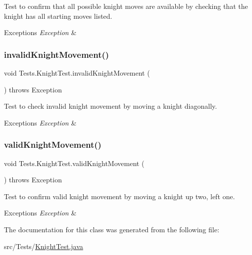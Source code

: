 Test to confirm that all possible knight moves are available by checking that the knight has all starting moves listed. 
\begin{DoxyExceptions}{Exceptions}
{\em Exception} & \\
\hline
\end{DoxyExceptions}
\hypertarget{class_tests_1_1_knight_test_a2055e2c815f2c80d89a9f9519702b712}{}\label{class_tests_1_1_knight_test_a2055e2c815f2c80d89a9f9519702b712} 
\subsubsection{\texorpdfstring{invalid\+Knight\+Movement()}{invalidKnightMovement()}}
{\footnotesize\ttfamily void Tests.\+Knight\+Test.\+invalid\+Knight\+Movement (\begin{DoxyParamCaption}{ }\end{DoxyParamCaption}) throws Exception}

Test to check invalid knight movement by moving a knight diagonally. 
\begin{DoxyExceptions}{Exceptions}
{\em Exception} & \\
\hline
\end{DoxyExceptions}
\hypertarget{class_tests_1_1_knight_test_aeef4aecba7d22407c8945dabf02ae3fa}{}\label{class_tests_1_1_knight_test_aeef4aecba7d22407c8945dabf02ae3fa} 
\subsubsection{\texorpdfstring{valid\+Knight\+Movement()}{validKnightMovement()}}
{\footnotesize\ttfamily void Tests.\+Knight\+Test.\+valid\+Knight\+Movement (\begin{DoxyParamCaption}{ }\end{DoxyParamCaption}) throws Exception}

Test to confirm valid knight movement by moving a knight up two, left one. 
\begin{DoxyExceptions}{Exceptions}
{\em Exception} & \\
\hline
\end{DoxyExceptions}


The documentation for this class was generated from the following file\+:\begin{DoxyCompactItemize}
\item 
src/\+Tests/\hyperlink{_knight_test_8java}{Knight\+Test.\+java}\end{DoxyCompactItemize}
